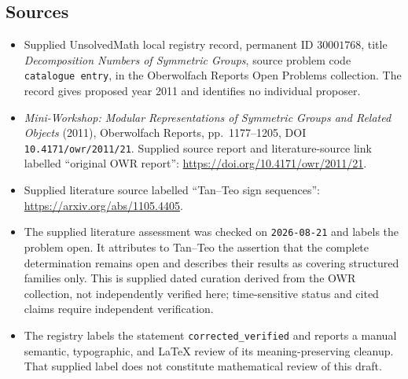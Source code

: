 \documentclass[11pt]{article}
\begin{document}
\subsection{Sources}
\begin{itemize}
\item Supplied UnsolvedMath local registry record, permanent ID \(30001768\), title \emph{Decomposition Numbers of Symmetric Groups}, source problem code \texttt{catalogue entry}, in the Oberwolfach Reports Open Problems collection. The record gives proposed year 2011 and identifies no individual proposer.
\item \emph{Mini-Workshop: Modular Representations of Symmetric Groups and Related Objects} (2011), Oberwolfach Reports, pp.\ 1177--1205, DOI \texttt{10.4171/owr/2011/21}. Supplied source report and literature-source link labelled ``original OWR report'': \url{https://doi.org/10.4171/owr/2011/21}.
\item Supplied literature source labelled ``Tan--Teo sign sequences'': \url{https://arxiv.org/abs/1105.4405}.
\item The supplied literature assessment was checked on \texttt{2026-08-21} and labels the problem open. It attributes to Tan--Teo the assertion that the complete determination remains open and describes their results as covering structured families only. This is supplied dated curation derived from the OWR collection, not independently verified here; time-sensitive status and cited claims require independent verification.
\item The registry labels the statement \texttt{corrected\_verified} and reports a manual semantic, typographic, and LaTeX review of its meaning-preserving cleanup. That supplied label does not constitute mathematical review of this draft.
\end{itemize}
\end{document}
